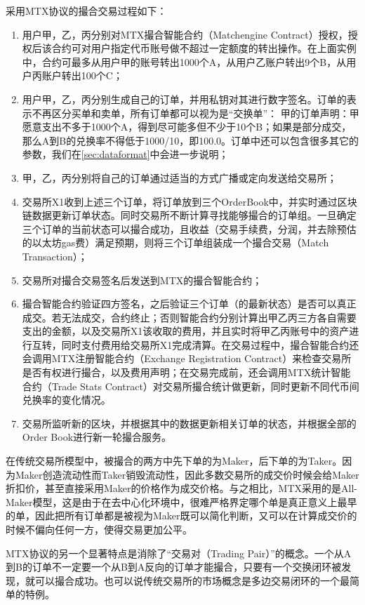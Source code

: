 \documentclass[UTF8,nofonts]{ctexart}
\begin{document}
采用MTX协议的撮合交易过程如下：

\begin{enumerate}
	\item 用户甲，乙，丙分别对MTX撮合智能合约（Matchengine Contract）授权，授权后该合约可对用户指定代币账号做不超过一定额度的转出操作。在上面实例中，合约可最多从用户甲的账号转出1000个A，从用户乙账户转出9个B，从用户丙账户转出100个C；
	\item 用户甲，乙，丙分别生成自己的订单，并用私钥对其进行数字签名。订单的表示不再区分买单和卖单，所有订单都可以视为是“交换单”： 甲的订单声明：甲愿意支出不多于1000个A，得到尽可能多但不少于10个B；如果是部分成交，那么A到B的兑换率不得低于1000/10，即100.0。订单中还可以包含很多其它的参数，我们在\ref{sec:dataformat}中会进一步说明；
	\item 甲，乙，丙分别将自己的订单通过适当的方式广播或定向发送给交易所；
	\item 交易所X1收到上述三个订单，将订单放到三个OrderBook中，并实时通过区块链数据更新订单状态。同时交易所不断计算寻找能够撮合的订单组。一旦确定三个订单的当前状态可以撮合成功，且收益（交易手续费，分润，并去除预估的以太坊gas费）满足预期，则将三个订单组装成一个撮合交易（Match Transaction）；
	\item 交易所对撮合交易签名后发送到MTX的撮合智能合约；
	\item 撮合智能合约验证四方签名，之后验证三个订单（的最新状态）是否可以真正成交。若无法成交，合约终止；否则智能合约分别计算出甲乙丙三方各自需要支出的金额，以及交易所X1该收取的费用，并且实时将甲乙丙账号中的资产进行互转，同时支付费用给交易所X1完成清算。在交易过程中，撮合智能合约还会调用MTX注册智能合约（Exchange Registration Contract）来检查交易所是否有权进行撮合，以及费用声明；在交易完成前，还会调用MTX统计智能合约（Trade Stats Contract）对交易所撮合统计做更新，同时更新不同代币间兑换率的变化情况。
	\item 交易所监听新的区块，并根据其中的数据更新相关订单的状态，并根据全部的Order Book进行新一轮撮合服务。
\end{enumerate}

在传统交易所模型中，被撮合的两方中先下单的为Maker，后下单的为Taker。因为Maker创造流动性而Taker销毁流动性，因此多数交易所的成交价时候会给Maker折扣价，甚至直接采用Maker的价格作为成交价格。与之相比，MTX采用的是All-Maker模型，这是由于在去中心化环境中，很难严格界定哪个单是真正意义上最早的单，因此把所有订单都是被视为Maker既可以简化判断，又可以在计算成交价的时候不偏向任何一方，使得交易更加公平。

MTX协议的另一个显著特点是消除了“交易对（Trading Pair）”的概念。一个从A到B的订单不一定要一个从B到A反向的订单才能撮合，只要有一个交换闭环被发现，就可以撮合成功。也可以说传统交易所的市场概念是多边交易闭环的一个最简单的特例。
\end{document}
